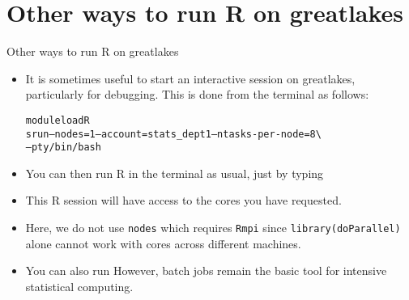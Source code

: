 \section{Other ways to run R on greatlakes}

\begin{frame}[fragile]{Other ways to run R on greatlakes}

\begin{itemize}
\item It is sometimes useful to start an interactive session on greatlakes, particularly for debugging. This is done from the terminal as follows: 
\begin{knitrout}\small
{}\color{fgcolor}\begin{kframe}
\begin{alltt}
module load R
srun --nodes=1 --account=stats_dept1 --ntasks-per-node=8 \textbackslash{}
  --pty /bin/bash
\end{alltt}
\end{kframe}
\end{knitrout}
\item You can then run R in the terminal as usual, just by typing
\begin{knitrout}\small
{}\color{fgcolor}\begin{kframe}
\begin{alltt}
\end{alltt}
\end{kframe}
\end{knitrout}
\item This R session will have access to the cores you have requested.
\item Here, we do not use \texttt{nodes} which requires \texttt{Rmpi} since \texttt{library(doParallel)}
alone cannot work with cores across different machines.
\item You can also run 
However, batch jobs remain the basic tool for intensive statistical computing.
\end{itemize}

\end{frame}


